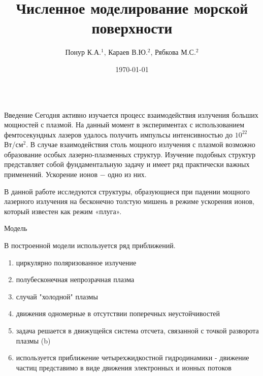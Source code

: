 
\title{Численное моделирование морской поверхности}
\author{Понур К.А.$^{1}$, Караев В.Ю.$^2$, Рябкова М.С.$^2$}
\date{\today}
\newcommand{\tK}{\widetilde{K}}
\usepackage{mathtools}
\newcommand{\mean}[1]{\langle #1 \rangle}

  \begin{frame}[t]{} 
    \begin{columns}[t]
      \begin{column}{.48\linewidth}
        \begin{block}{Введение}
            Сегодня активно изучается процесс взаимодействия излучения больших мощностей с плазмой. На данный момент в экспериментах с использованием фемтосекундных лазеров удалось получить импульсы интенсивностью до $10^{22}$ Вт/см$^2$. В случае взаимодействия столь мощного излучения с плазмой возможно образование особых лазерно-плазменных структур. Изучение подобных структур представляет собой фундаментальную задачу и имеет ряд практически важных применений. Ускорение ионов $-$ одно из них. 

            В данной работе исследуются структуры, образующиеся при падении мощного лазерного излучения на бесконечно толстую мишень в режиме ускорения ионов, который известен как режим «плуга».
        \end{block}


        \begin{block}{Модель}

            В построенной модели используется ряд приближений. 
            \begin{enumerate}
            \item циркулярно поляризованное излучение
            \item полубесконечная непрозрачная плазма
            \item случай "холодной" плазмы
            \item движения одномерные в отсутствии поперечных неустойчивостей
            \item задача решается в движущейся система отсчета, связанной с точкой разворота плазмы (b)
            \item используется приближение четырехжидкостной гидродинамики - движение частиц представимо в виде движения электронных и ионных потоков
       

\end{enumerate}
\end{block}
\end{column}
\end{columns}
\end{frame}
